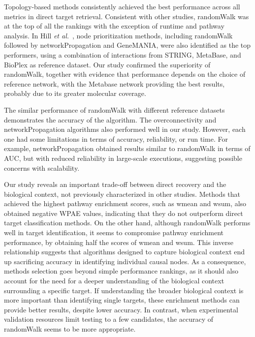 Topology-based methods consistently achieved the best performance across all metrics in direct target retrieval. 
Consistent with other studies, randomWalk was at the top of all the rankings with the exception of runtime and pathway analysis.
In Hill \textit{et al.}~\cite{RN37}, node prioritization methods, including randomWalk followed by networkPropagation and GeneMANIA, were also identified as the top performers, using a combination of interactions from STRING, MetaBase, and BioPlex as reference dataset. 
Our study confirmed the superiority of randomWalk, together with evidence that performance depends on the choice of reference network, with the Metabase network providing the best results, probably due to its greater molecular coverage.

The similar performance of randomWalk with different reference datasets demonstrates the accuracy of the algorithm. 
The overconnectivity and networkPropagation algorithms also performed well in our study. 
However, each one had some limitations in terms of accuracy, reliability, or run time. 
For example, networkPropagation obtained results similar to randomWalk in terms of \gls{AUC}, but with reduced reliability in large-scale executions, suggesting possible concerns with scalability.

Our study reveals an important trade-off between direct recovery and the biological context, not previously characterized in other studies. 
Methods that achieved the highest pathway enrichment scores, such as wmean and wsum, also obtained negative \gls{WPAE} values, indicating that they do not outperform direct target classification methods. 
On the other hand, although randomWalk performs well in target identification, it seems to compromise pathway enrichment performance, by obtaining half the scores of wmean and wsum. 
This inverse relationship suggests that algorithms designed to capture biological context end up sacrificing accuracy in identifying individual causal nodes. 
As a consequence, methods selection goes beyond simple performance rankings, as it should also account for the need for a deeper understanding of the biological context surrounding a specific target. 
If understanding the broader biological context is more important than identifying single targets, these enrichment methods can provide better results, despite lower accuracy. 
In contrast, when experimental validation resources limit testing to a few candidates, the accuracy of randomWalk seems to be more appropriate.

